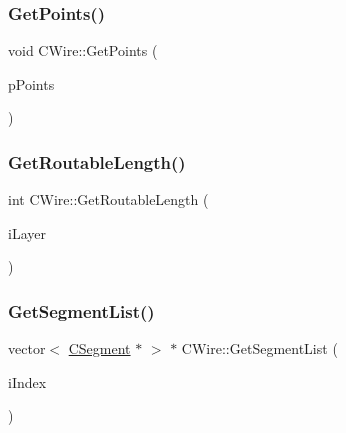 \mbox{\label{classCWire_a4799d4eeedb42ab2961ca93f25740368}} 
\subsubsection{\texorpdfstring{GetPoints()}{GetPoints()}}
{\footnotesize\ttfamily void C\+Wire\+::\+Get\+Points (\begin{DoxyParamCaption}\item[{vector$<$ \mbox{\hyperlink{classCPoint}{C\+Point}} $\ast$ $>$ $\ast$}]{p\+Points }\end{DoxyParamCaption})}

\mbox{\label{classCWire_af22afb5379acf1aa890692416c00b8e4}} 
\subsubsection{\texorpdfstring{GetRoutableLength()}{GetRoutableLength()}}
{\footnotesize\ttfamily int C\+Wire\+::\+Get\+Routable\+Length (\begin{DoxyParamCaption}\item[{int}]{i\+Layer }\end{DoxyParamCaption})}

\mbox{\label{classCWire_afab000638f87557894a8588f16ad0df4}} 
\subsubsection{\texorpdfstring{GetSegmentList()}{GetSegmentList()}}
{\footnotesize\ttfamily vector$<$ \mbox{\hyperlink{classCSegment}{C\+Segment}} $\ast$ $>$ $\ast$ C\+Wire\+::\+Get\+Segment\+List (\begin{DoxyParamCaption}\item[{int}]{i\+Index }\end{DoxyParamCaption})}

\mbox{\label{classCWire_a1ae9fcc1cce6786baafc20dd4adb27c0}} 
